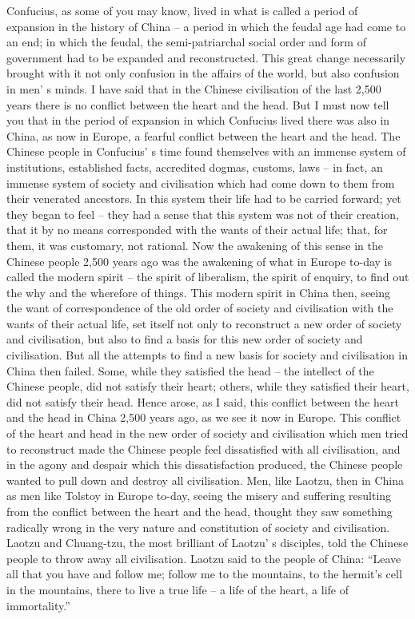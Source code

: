 Confucius, as some of you may know, lived in what is called a period of expansion in the history of China -- a period in which the feudal age had come to an end; in which the feudal, the semi-patriarchal social order and form of government had to be expanded and reconstructed. This great change necessarily brought with it not only confusion in the affairs of the world, but also confusion in men' s minds. I have said that in the Chinese civilisation of the last 2,500 years there is no conflict between the heart and the head. But I must now tell you that in the period of expansion in which Confucius lived there was also in China, as now in Europe, a fearful conflict between the heart and the head. The Chinese people in Confucius' s time found themselves with an immense system of institutions, established facts, accredited dogmas, customs, laws -- in fact, an immense system of society and civilisation which had come down to them from their venerated ancestors. In this system their life had to be carried forward; yet they began to feel -- they had a sense that this system was not of their creation, that it by no means corresponded with the wants of their actual life; that, for them, it was customary, not rational. Now the awakening of this sense in the Chinese people 2,500 years ago was the awakening of what in Europe to-day is called the modern spirit -- the spirit of liberalism, the spirit of enquiry, to find out the why and the wherefore of things. This modern spirit in China then, seeing the want of correspondence of the old order of society and civilisation with the wants of their actual life, set itself not only to reconstruct a new order of society and civilisation, but also to find a basis for this new order of society and civilisation. But all the attempts to find a new basis for society and civilisation in China then failed. Some, while they satisfied the head -- the intellect of the Chinese people, did not satisfy their heart; others, while they satisfied their heart, did not satisfy their head. Hence arose, as I said, this conflict between the heart and the head in China 2,500 years ago, as we see it now in Europe. This conflict of the heart and head in the new order of society and civilisation which men tried to reconstruct made the Chinese people feel dissatisfied with all civilisation, and in the agony and despair which this dissatisfaction produced, the Chinese people wanted to pull down and destroy all civilisation. Men, like Laotzu, then in China as men like Tolstoy in Europe to-day, seeing the misery and suffering resulting from the conflict between the heart and the head, thought they saw something radically wrong in the very nature and constitution of society and civilisation. Laotzu and Chuang-tzu, the most brilliant of Laotzu' s disciples, told the Chinese people to throw away all civilisation. Laotzu said to the people of China: ``Leave all that you have and follow me; follow me to the mountains, to the hermit's cell in the mountains, there to live a true life -- a life of the heart, a life of immortality.''

